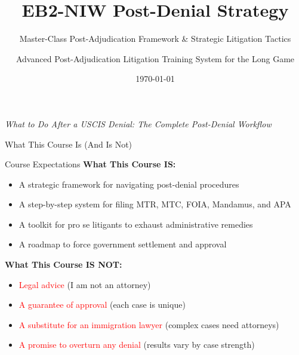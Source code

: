 \documentclass[11pt]{beamer}
\title{EB2-NIW Post-Denial Strategy}
\subtitle{Master-Class Post-Adjudication Framework \& Strategic Litigation Tactics}
\author{Advanced Post-Adjudication Litigation Training System for the Long Game}
\date{\today}
\begin{document}
	
	\begin{frame}
		\titlepage
		\centering
		\scriptsize \textit{What to Do After a USCIS Denial: The Complete Post-Denial Workflow}
	\end{frame}
	
	
	\begin{frame}{What This Course Is (And Is Not)}
		\scriptsize
		\begin{block}{Course Expectations}
			\textbf{What This Course IS:}
			\begin{itemize}
				\item A strategic framework for navigating post-denial procedures
				\item A step-by-step system for filing MTR, MTC, FOIA, Mandamus, and APA
				\item A toolkit for pro se litigants to exhaust administrative remedies
				\item A roadmap to force government settlement and approval
			\end{itemize}
			\textbf{What This Course IS NOT:}
			\begin{itemize}
				\item \textcolor{red}{Legal advice} (I am not an attorney)
				\item \textcolor{red}{A guarantee of approval} (each case is unique)
				\item \textcolor{red}{A substitute for an immigration lawyer} (complex cases need attorneys)
				\item \textcolor{red}{A promise to overturn any denial} (results vary by case strength)
			\end{itemize}
		\end{block}
	\end{frame}
	
	
	
\end{document}
